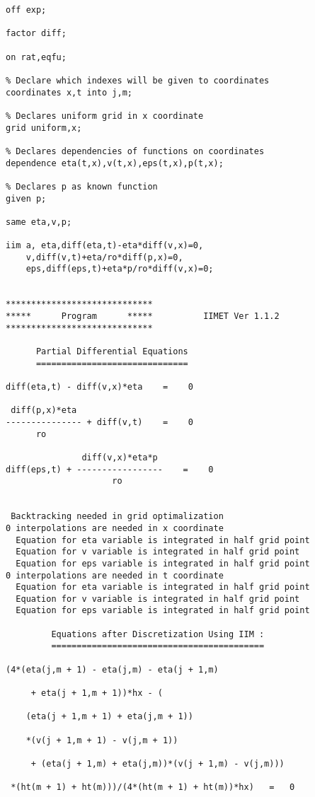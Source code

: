 \begin{verbatim}
off exp;

factor diff;

on rat,eqfu;

% Declare which indexes will be given to coordinates
coordinates x,t into j,m;

% Declares uniform grid in x coordinate
grid uniform,x;

% Declares dependencies of functions on coordinates
dependence eta(t,x),v(t,x),eps(t,x),p(t,x);

% Declares p as known function
given p;

same eta,v,p;

iim a, eta,diff(eta,t)-eta*diff(v,x)=0,
    v,diff(v,t)+eta/ro*diff(p,x)=0,
    eps,diff(eps,t)+eta*p/ro*diff(v,x)=0;


*****************************
*****      Program      *****          IIMET Ver 1.1.2
*****************************

      Partial Differential Equations
      ==============================

diff(eta,t) - diff(v,x)*eta    =    0

 diff(p,x)*eta
--------------- + diff(v,t)    =    0
      ro

               diff(v,x)*eta*p
diff(eps,t) + -----------------    =    0
                     ro


 Backtracking needed in grid optimalization
0 interpolations are needed in x coordinate
  Equation for eta variable is integrated in half grid point
  Equation for v variable is integrated in half grid point
  Equation for eps variable is integrated in half grid point
0 interpolations are needed in t coordinate
  Equation for eta variable is integrated in half grid point
  Equation for v variable is integrated in half grid point
  Equation for eps variable is integrated in half grid point

         Equations after Discretization Using IIM :
         ==========================================

(4*(eta(j,m + 1) - eta(j,m) - eta(j + 1,m)

     + eta(j + 1,m + 1))*hx - (

    (eta(j + 1,m + 1) + eta(j,m + 1))

    *(v(j + 1,m + 1) - v(j,m + 1))

     + (eta(j + 1,m) + eta(j,m))*(v(j + 1,m) - v(j,m)))

 *(ht(m + 1) + ht(m)))/(4*(ht(m + 1) + ht(m))*hx)   =   0



\end{verbatim}
